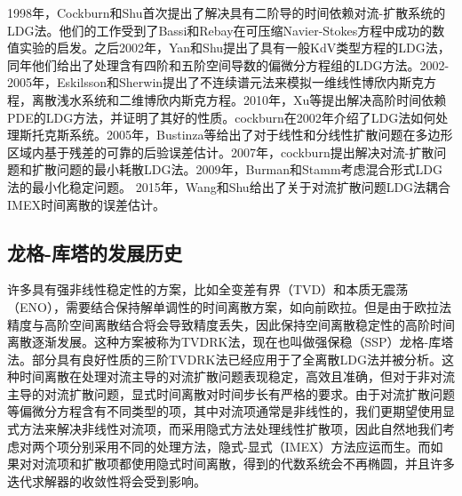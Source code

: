 1998年，Cockburn和Shu首次提出了解决具有二阶导的时间依赖对流-扩散系统的LDG法\cite{cockburn1998local}。他们的工作受到了Bassi和Rebay在可压缩Navier-Stokes方程中成功的数值实验的启发\cite{bassi1997high}。之后2002年，Yan和Shu提出了具有一般KdV类型方程的LDG法\cite{yan2002localb}，同年他们给出了处理含有四阶和五阶空间导数的偏微分方程组的LDG方法\cite{yan2002local}。2002-2005年，Eskilsson和Sherwin提出了不连续谱元法来模拟一维线性博欣内斯克方程，离散浅水系统和二维博欣内斯克方程\cite{eskilsson2002discontinuous,eskilsson2005discontinuous,eskilsson2005discontinuousb}。2010年，Xu等提出解决高阶时间依赖PDE的LDG方法\cite{xu2010local}，并证明了其好的性质。cockburn在2002年介绍了LDG法如何处理斯托克斯系统\cite{cockburn2002local}。2005年，Bustinza等给出了对于线性和分线性扩散问题在多边形区域内基于残差的可靠的后验误差估计\cite{bustinza2005posteriori}。2007年，cockburn提出解决对流-扩散问题和扩散问题的最小耗散LDG法\cite{cockburn2007analysis}。2009年，Burman和Stamm考虑混合形式LDG法的最小化稳定问题。
2015年，Wang和Shu给出了关于对流扩散问题LDG法耦合IMEX时间离散的误差估计\cite{wang2015stability}。

\subsection{龙格-库塔的发展历史}
许多具有强非线性稳定性的方案，比如全变差有界（TVD）和本质无震荡（ENO），需要结合保持解单调性的时间离散方案，如向前欧拉。但是由于欧拉法精度与高阶空间离散结合将会导致精度丢失，因此保持空间离散稳定性的高阶时间离散逐渐发展\cite{shu1988efficient}。这种方案被称为TVDRK法，现在也叫做强保稳（SSP）龙格-库塔法。部分具有良好性质的三阶TVDRK法\cite{shu2007efficient}已经应用于了全离散LDG法并被分析\cite{wang2013errora}。这种时间离散在处理对流主导的对流扩散问题表现稳定，高效且准确，但对于非对流主导的对流扩散问题，显式时间离散对时间步长有严格的要求\cite{shu2007efficient}。由于对流扩散问题等偏微分方程含有不同类型的项，其中对流项通常是非线性的，我们更期望使用显式方法来解决非线性对流项，而采用隐式方法处理线性扩散项，因此自然地我们考虑对两个项分别采用不同的处理方法，隐式-显式（IMEX）方法应运而生\cite{ascher1997implicitexplicita}。而如果对对流项和扩散项都使用隐式时间离散，得到的代数系统会不再椭圆，并且许多迭代求解器的收敛性将会受到影响。

